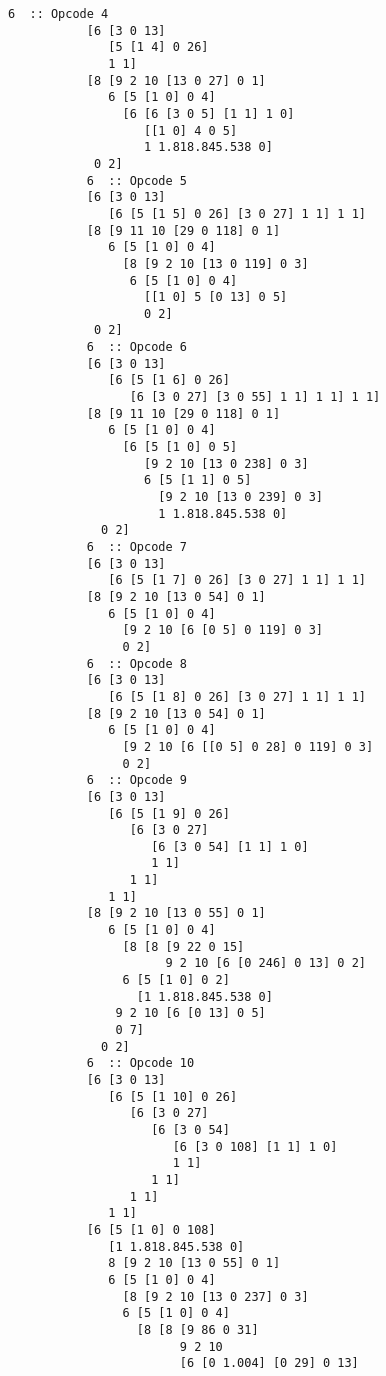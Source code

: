 \documentclass[twoside]{article}
\begin{document}
\begin{lstlisting}[style=listingcode]
           6  :: Opcode 4
           [6 [3 0 13]
              [5 [1 4] 0 26]
              1 1]
           [8 [9 2 10 [13 0 27] 0 1]
              6 [5 [1 0] 0 4]
                [6 [6 [3 0 5] [1 1] 1 0]
                   [[1 0] 4 0 5]
                   1 1.818.845.538 0]
            0 2]
           6  :: Opcode 5
           [6 [3 0 13]
              [6 [5 [1 5] 0 26] [3 0 27] 1 1] 1 1]
           [8 [9 11 10 [29 0 118] 0 1]
              6 [5 [1 0] 0 4]
                [8 [9 2 10 [13 0 119] 0 3]
                 6 [5 [1 0] 0 4]
                   [[1 0] 5 [0 13] 0 5]
                   0 2]
            0 2]
           6  :: Opcode 6
           [6 [3 0 13]
              [6 [5 [1 6] 0 26]
                 [6 [3 0 27] [3 0 55] 1 1] 1 1] 1 1]
           [8 [9 11 10 [29 0 118] 0 1]
              6 [5 [1 0] 0 4]
                [6 [5 [1 0] 0 5]
                   [9 2 10 [13 0 238] 0 3]
                   6 [5 [1 1] 0 5]
                     [9 2 10 [13 0 239] 0 3]
                     1 1.818.845.538 0]
             0 2]
           6  :: Opcode 7
           [6 [3 0 13]
              [6 [5 [1 7] 0 26] [3 0 27] 1 1] 1 1]
           [8 [9 2 10 [13 0 54] 0 1]
              6 [5 [1 0] 0 4]
                [9 2 10 [6 [0 5] 0 119] 0 3]
                0 2]
           6  :: Opcode 8
           [6 [3 0 13]
              [6 [5 [1 8] 0 26] [3 0 27] 1 1] 1 1]
           [8 [9 2 10 [13 0 54] 0 1]
              6 [5 [1 0] 0 4]
                [9 2 10 [6 [[0 5] 0 28] 0 119] 0 3]
                0 2]
           6  :: Opcode 9
           [6 [3 0 13]
              [6 [5 [1 9] 0 26]
                 [6 [3 0 27]
                    [6 [3 0 54] [1 1] 1 0]
                    1 1]
                 1 1]
              1 1]
           [8 [9 2 10 [13 0 55] 0 1]
              6 [5 [1 0] 0 4]
                [8 [8 [9 22 0 15]
                      9 2 10 [6 [0 246] 0 13] 0 2]
                6 [5 [1 0] 0 2]
                  [1 1.818.845.538 0]
               9 2 10 [6 [0 13] 0 5]
               0 7]
             0 2]
           6  :: Opcode 10
           [6 [3 0 13]
              [6 [5 [1 10] 0 26]
                 [6 [3 0 27]
                    [6 [3 0 54]
                       [6 [3 0 108] [1 1] 1 0]
                       1 1]
                    1 1]
                 1 1]
              1 1]
           [6 [5 [1 0] 0 108]
              [1 1.818.845.538 0]
              8 [9 2 10 [13 0 55] 0 1]
              6 [5 [1 0] 0 4]
                [8 [9 2 10 [13 0 237] 0 3]
                6 [5 [1 0] 0 4]
                  [8 [8 [9 86 0 31]
                        9 2 10
                        [6 [0 1.004] [0 29] 0 13]

\end{lstlisting}
\end{document}
